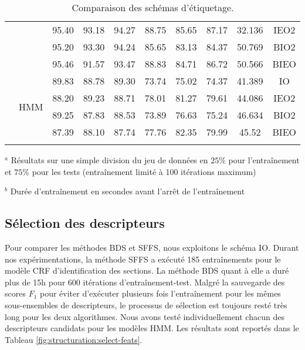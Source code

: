 \begin{table}[ht]
\begin{center}
\begin{tabular}{p{0.9cm}|c|cccccccc}
&  & 95.40 & 93.18 & 94.27 & 88.75 & 85.65 & 87.17 & 32.136 & IEO2 \\
 &  & 95.20 & 93.30 & 94.24 & 85.65 & 83.13 & 84.37 & 50.769 & BIO2 \\
  &  & 95.46 & 91.57 & 93.47 & 88.83 & 84.71 & 86.72 & 50.566 & BIEO \\ \cline{2-10}
  & \multirow{4}{*}{HMM} & 89.83 & 88.78 & 89.30 & 73.74 & 75.02 & 74.37 &  41.389 & IO \\%
   &  & 88.20 & 89.23 & 88.71 & 78.01 & 81.27 & 79.61 & 44.086 & IEO2 \\
  &  & 89.25 & 87.83 & 88.53 & 73.89 & 76.63 & 75.24 & 46.634 & BIO2 \\
  &  & 87.39 & 88.10 & 87.74 & 77.76 & 82.35 & 79.99 & 45.52& BIEO \\ 
\noalign{\smallskip}\hline\noalign{\smallskip}
\end{tabular}
\end{center}

$^a$ Résultats sur une simple division du jeu de données en $25\%$ pour l'entraînement et  $75\%$ pour les tests (entraînement limité à 100 itérations maximum)

$^b$ Durée d'entraînement en secondes avant l'arrêt de l'entraînement

\caption{Comparaison des schémas d'étiquetage.}\label{fig:structuration:select-segm-repr}
\end{table}


\subsection{Sélection des descripteurs}
Pour comparer les méthodes BDS et SFFS, nous exploitons le schéma IO. Durant nos expérimentations, la méthode SFFS a exécuté 185 entraînements pour le modèle CRF d'identification des sections. La méthode BDS quant à elle a duré plus de 15h pour 600 itérations d'entraînement-test. Malgré la sauvegarde des scores $F_1$ pour éviter d'exécuter plusieurs fois l'entraînement pour les mêmes sous-ensembles de descripteurs, le processus de sélection est toujours resté très long pour les deux algorithmes. Nous avons testé individuellement chacun des descripteurs candidats pour les modèles HMM. Les résultats sont reportés dans le Tableau \ref{fig:structuration:select-feats}.

